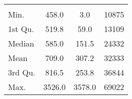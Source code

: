 \begin{tabular}{lS[table-format=5.1]S[table-format=5.1]S[table-format=5.1]}
&  &  &  \\
 Min.    & 458.0 & 3.0 & 10875 \\
 1st Qu. & 519.8 & 59.0 & 13109 \\
 Median  & 585.0 & 151.5 & 24332 \\
 Mean    & 709.0 & 307.2 & 32333 \\
 3rd Qu. & 816.5 & 253.8 & 36844 \\
 Max.    & 3526.0 & 3578.0 & 69022 \\
\end{tabular}
